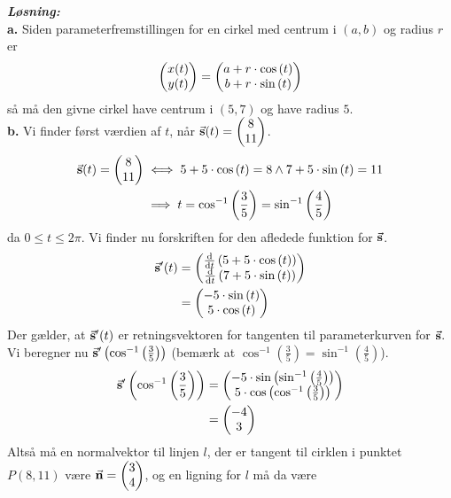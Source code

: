 \documentclass{article}
\newcommand{\sol}{\setlength{\parindent}{0cm}\textbf{\textit{Løsning:}}\setlength{\parindent}{1cm}}
\begin{document}
\sol \\
\textbf{a.}
Siden parameterfremstillingen for en cirkel med centrum i $\left(a,b\right) $ og radius $r$ er
\[
\mqty(x(t)\\ y(t))=\mqty(a + r \cdot \cos\left(t\right) \\ b + r \cdot \sin\left(t\right) ) 
\] 
så må den givne cirkel have centrum i $(5,7)$ og have radius $5$. \\[1ex]
\textbf{b.}
Vi finder først værdien af $t$, når $\va{s}(t)=\mqty(8\\ 11) $.
\begin{equation*}
\begin{split}
  \va{s}(t)=\mqty(8\\ 11) &\iff 5+5 \cdot \cos\left(t\right) =8 \land 7+5 \cdot \sin\left(t\right) =11\\
  &\implies t=\cos^{-1}\left(\frac{3}{5}\right) =\sin^{-1}\left(\frac{4}{5}\right) 
\end{split}
\end{equation*}
da $0 \leq t \leq 2 \pi $.
Vi finder nu forskriften for den afledede funktion for $\va{s} $.
\begin{equation*}
\begin{split}
  \va{s}'(t)&=\mqty(\dv{t} \left(5+5 \cdot \cos\left(t\right) \right) \\ \dv{t} \left(7+5 \cdot \sin\left(t\right) \right) ) \\
  &=\mqty(-5 \cdot \sin\left(t\right) \\ 5 \cdot \cos\left(t\right) ) 
\end{split}
\end{equation*}
Der gælder, at $\va{s}'(t)$ er retningsvektoren for tangenten til parameterkurven for $\va{s} $. 
Vi beregner nu $\va{s}'\left(\cos^{-1}\left(\frac{3}{5}\right) \right) $ (bemærk at $\cos^{-1}\left(\frac{3}{5}\right) =\sin^{-1}\left(\frac{4}{5}\right) $).
\begin{equation*}
\begin{split}
  \va{s}'\left(\cos^{-1}\left(\frac{3}{5}\right) \right) &=\mqty(-5 \cdot \sin\left(\sin^{-1}\left(\frac{4}{5}\right) \right) \\ 5 \cdot \cos\left(\cos^{-1}\left(\frac{3}{5}\right) \right) ) \\
  &=\mqty(-4\\ 3) 
\end{split}
\end{equation*}
Altså må en normalvektor til linjen $l$, der er tangent til cirklen i punktet $P(8,11)$ være $\va{n} =\mqty(3\\ 4) $, og en ligning for $l$ må da være 
\end{document}
